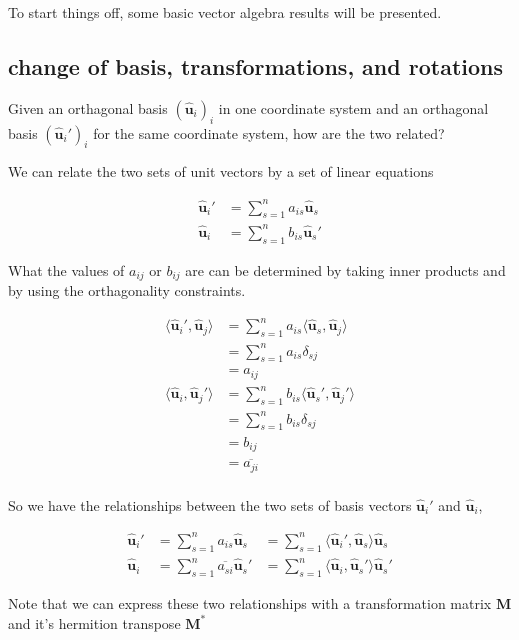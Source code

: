 \documentclass{article}      %
\newcommand{\Bu}[0]{\mathbf{u}}
\newcommand{\BM}[0]{\mathbf{M}}
\newcommand{\ucap}[1]{\hat{\Bu}_{#1}}
\newcommand{\innerprod}[2]{\langle{#1}, {#2}\rangle}
\begin{document}
To start things off, some basic vector algebra results will be presented.

\subsection{change of basis, transformations, and rotations}

Given an orthagonal basis $(\ucap{i})_i$ in one coordinate system and an
orthagonal basis $(\ucap{i}')_i$ for the same coordinate system, how are
the two related?

We can relate the two sets of unit vectors by a set of linear equations

\begin{align*}
\ucap{i}' &= \sum_{s=1}^n{a_{is}\ucap{s}} \\
\ucap{i} &= \sum_{s=1}^n{b_{is}\ucap{s}'}
\end{align*}

What the values of $a_{ij}$ or $b_{ij}$ are can be determined by taking inner products and by using the
orthagonality constraints.

\begin{align*}
\innerprod{\ucap{i}'}{\ucap{j}} &= \sum_{s=1}^n{a_{is}\innerprod{\ucap{s}}{\ucap{j}}} \\
                                &= \sum_{s=1}^n{a_{is}\delta_{sj}} \\
                                &= a_{ij} \\
\innerprod{\ucap{i}}{\ucap{j}'} &= \sum_{s=1}^n{b_{is}\innerprod{\ucap{s}'}{\ucap{j}'}} \\
                                &= \sum_{s=1}^n{b_{is}\delta_{sj}} \\
                                &= b_{ij} \\
                                &= \overline{a_{ji}} \\
\end{align*}

So we have the relationships between the two sets of basis vectors $\ucap{i}'$ and $\ucap{i}$,

\begin{align*}
\ucap{i}'
&= \sum_{s=1}^n{
a_{is}
\ucap{s}
}
&=
\sum_{s=1}^n{
\innerprod{\ucap{i}'}{\ucap{s}}
\ucap{s}
}
\\
\ucap{i}
&= \sum_{s=1}^n{
\overline{a_{si}}
\ucap{s}'
}
&=
\sum_{s=1}^n{
\innerprod{\ucap{i}}{\ucap{s}'}
\ucap{s}'
}
\end{align*}

Note that we can express these two relationships with a transformation
matrix $\BM$ and it's hermition transpose $\BM^*$
\end{document}
